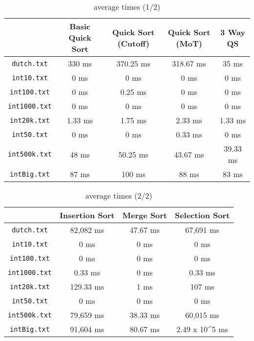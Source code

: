 \documentclass{article}
\newcommand{\code}[1]{\texttt{#1}}
\begin{document}
\begin{table}[H]
\centering
\begin{tabular}{|c|c|c|c|c|}
\hline
            & Basic Quick Sort & Quick Sort (Cutoff) & Quick Sort (MoT) & 3 Way QS \\ \hline
\code{dutch.txt}   & 330 ms           & 370.25 ms           & 318.67 ms        & 35 ms    \\
\code{int10.txt}   & 0 ms             & 0 ms                & 0 ms             & 0 ms     \\
\code{int100.txt}  & 0 ms             & 0.25 ms             & 0 ms             & 0 ms     \\
\code{int1000.txt} & 0 ms             & 0 ms                & 0 ms             & 0 ms     \\
\code{int20k.txt}  & 1.33 ms          & 1.75 ms             & 2.33 ms          & 1.33 ms  \\
\code{int50.txt}   & 0 ms             & 0 ms                & 0.33 ms          & 0 ms     \\
\code{int500k.txt} & 48 ms            & 50.25 ms            & 43.67 ms         & 39.33 ms \\
\code{intBig.txt}  & 87 ms            & 100 ms              & 88 ms            & 83 ms    \\ \hline
\end{tabular}
\caption{average times (1/2)}
\label{tab:my-table}
\end{table}

\bigskip

\begin{table}[H]
\centering
\begin{tabular}{|c|c|c|c|}
\hline
            & Insertion Sort & Merge Sort & Selection Sort                  \\ \hline
\code{dutch.txt}   & 82,082 ms      & 47.67 ms   & 67,691 ms                       \\
\code{int10.txt}   & 0 ms           & 0 ms       & 0 ms                            \\
\code{int100.txt}  & 0 ms           & 0 ms       & 0 ms                            \\
\code{int1000.txt} & 0.33 ms        & 0 ms       & 0.33 ms                         \\
\code{int20k.txt}  & 129.33 ms      & 1 ms       & 107 ms                          \\
\code{int50.txt}   & 0 ms           & 0 ms       & 0 ms                            \\
\code{int500k.txt} & 79,659 ms      & 38.33 ms   & 60,015 ms                       \\
\code{intBig.txt}  & 91,604 ms      & 80.67 ms   & 2.49 x 10^5 ms                  \\ \hline
\end{tabular}
\caption{average times (2/2)}
\label{tab:my-table}
\end{table}
\end{document}
